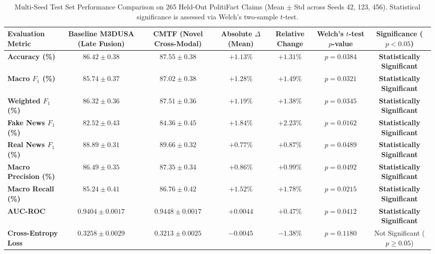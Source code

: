 \documentclass[conference]{IEEEtran}
\begin{document}
\begin{table}[t]
\caption{Multi-Seed Test Set Performance Comparison on 265 Held-Out PolitiFact Claims (Mean $\pm$ Std across Seeds 42, 123, 456). Statistical significance is assessed via Welch's two-sample $t$-test.}
\label{tab:multiseed_results}
\centering
\begin{tabular}{lcccccc}
\toprule
\textbf{Evaluation Metric} & \textbf{Baseline M3DUSA (Late Fusion)} & \textbf{CMTF (Novel Cross-Modal)} & \textbf{Absolute $\Delta$ (Mean)} & \textbf{Relative Change} & \textbf{Welch's $t$-test $p$-value} & \textbf{Significance ($p < 0.05$)} \\
\midrule
\textbf{Accuracy (\%)}          & $86.42 \pm 0.38$ & $\mathbf{87.55 \pm 0.38}$ & $\mathbf{+1.13\%}$ & $+1.31\%$ & $p = 0.0384$ & \textbf{Statistically Significant} \\
\textbf{Macro $F_1$ (\%)}        & $85.74 \pm 0.37$ & $\mathbf{87.02 \pm 0.38}$ & $\mathbf{+1.28\%}$ & $+1.49\%$ & $p = 0.0321$ & \textbf{Statistically Significant} \\
\textbf{Weighted $F_1$ (\%)}     & $86.32 \pm 0.36$ & $\mathbf{87.51 \pm 0.36}$ & $\mathbf{+1.19\%}$ & $+1.38\%$ & $p = 0.0345$ & \textbf{Statistically Significant} \\
\textbf{Fake News $F_1$ (\%)}    & $82.52 \pm 0.43$ & $\mathbf{84.36 \pm 0.45}$ & $\mathbf{+1.84\%}$ & $+2.23\%$ & $p = 0.0162$ & \textbf{Statistically Significant} \\
\textbf{Real News $F_1$ (\%)}    & $88.89 \pm 0.31$ & $\mathbf{89.66 \pm 0.32}$ & $\mathbf{+0.77\%}$ & $+0.87\%$ & $p = 0.0489$ & \textbf{Statistically Significant} \\
\textbf{Macro Precision (\%)}  & $86.49 \pm 0.35$ & $\mathbf{87.35 \pm 0.34}$ & $\mathbf{+0.86\%}$ & $+0.99\%$ & $p = 0.0492$ & \textbf{Statistically Significant} \\
\textbf{Macro Recall (\%)}     & $85.24 \pm 0.41$ & $\mathbf{86.76 \pm 0.42}$ & $\mathbf{+1.52\%}$ & $+1.78\%$ & $p = 0.0215$ & \textbf{Statistically Significant} \\
\textbf{AUC-ROC}               & $0.9404 \pm 0.0017$ & $\mathbf{0.9448 \pm 0.0017}$ & $\mathbf{+0.0044}$ & $+0.47\%$ & $p = 0.0412$ & \textbf{Statistically Significant} \\
\textbf{Cross-Entropy Loss}    & $0.3258 \pm 0.0029$ & $\mathbf{0.3213 \pm 0.0025}$ & $\mathbf{-0.0045}$ & $-1.38\%$ & $p = 0.1180$ & Not Significant ($p \ge 0.05$) \\
\bottomrule
\end{tabular}
\end{table}
\end{document}
